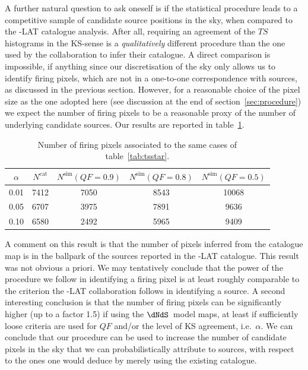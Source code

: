 A further natural question to ask oneself is if the statistical procedure leads to a competitive sample of candidate source positions in the sky, when compared to the \Fermi-LAT catalogue analysis. After all, requiring an agreement of the $TS$ histograms in the KS-sense is a \textit{qualitatively} different procedure than the one used by the collaboration to infer their catalogue. 
A direct comparison is impossible, if anything since our discretisation of the sky only allows us to identify firing pixels, which are not in a one-to-one correspondence with sources, as discussed in the previous section. However, for a reasonable choice of the pixel size as the one adopted here (see discussion at the end of section~\ref{sec:procedure}) we expect the number of  firing pixels to be a reasonable proxy of the number of underlying candidate sources. Our results are reported in table~\ref{tab:number_firing}.
\begin{table}[!h]
    \renewcommand{\arraystretch}{1.2}
    \centering
    \begin{tabular}{c|c|c|c|c}   
        $\alpha$ & $N^\textrm{cat}$ & $N^\textrm{sim}(QF=0.9)$& $N^\textrm{sim}(QF=0.8)$& $N^\textrm{sim}(QF=0.5)$\\
        \hline 
       0.01 & 7412 & 7050 & 8543  & 10068\\
        \hline 
       0.05 & 6707 & 3975 & 7891  & 9636\\
        \hline 
       0.10 & 6580 & 2492 & 5965  & 9409\\
    \end{tabular}
\caption{Number of firing pixels associated to the same cases of table~\ref{tab:tsstar}.}  
\label{tab:number_firing}
\end{table}

A comment on this result is that the number of pixels inferred from the catalogue map is in the ballpark of the sources reported in the \Fermi-LAT catalogue. This result was not obvious a priori. We may tentatively conclude that the power of the procedure we follow in identifying a firing pixel  is at least roughly comparable to the criterion the \Fermi-LAT collaboration follows in identifying a source. 
A second interesting conclusion is that the number of firing pixels can be significantly higher (up to a factor 1.5) if using the $\dNdS$~model maps, at least if sufficiently loose criteria are used for $QF$ and/or the level of KS agreement, i.e.~$\alpha$. We can conclude  that our procedure can be used to increase the number of candidate pixels in the sky that we can probabilistically attribute to sources, with respect to the ones one would deduce by merely using the existing catalogue.   

